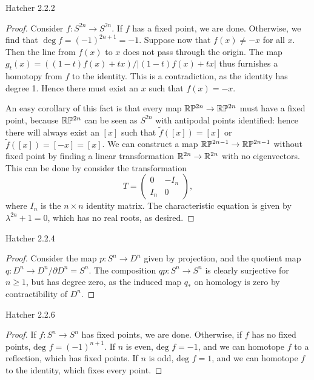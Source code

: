\documentclass{../../mathnotes}
\begin{document}
\begin{prop}
    Hatcher 2.2.2    
\end{prop}
\begin{proof}
    Consider $f:S^{2n}\to S^{2n}$. If $f$ has a fixed point, we are done. Otherwise, we find that $\deg f=(-1)^{2n+1}=-1$.
    Suppose now that $f(x)\neq -x$ for all $x$. Then the line from $f(x)$ to $x$ does not pass through the origin. The
    map $g_t(x)=\left( (1-t)f(x)+tx \right)/|(1-t)f(x)+tx|$ thus furnishes a homotopy from $f$ to the identity. This is
    a contradiction, as the identity has degree 1. Hence there must exist an $x$ such that $f(x)=-x$.

    An easy corollary of this fact is that every map $\mathbb{R}\mathbb{P}^{2n}\to\mathbb{R}\mathbb{P}^{2n}$ must have a fixed point, because
    $\mathbb{R}\mathbb{P}^{2n}$ can be seen as $S^{2n}$ with antipodal points identified: hence there will always exist an $[x]$
    such that $\tilde f([x])=[x]$ or $\tilde f([x])=[-x]=[x]$. We can construct a map $\mathbb{R}\mathbb{P}^{2n-1}\to\mathbb{R}\mathbb{P}^{2n-1}$
    without fixed point by finding a linear transformation $\mathbb{R}^{2n}\to\mathbb{R}^{2n}$ with no eigenvectors. This can
    be done by consider the transformation
    \begin{equation*}
        T=
        \begin{pmatrix}
            0 & -I_n\\
            I_n & 0
        \end{pmatrix},
    \end{equation*}
    where $I_n$ is the $n\times n$ identity matrix. The characteristic equation is given by $\lambda^{2n}+1=0$, which
    has no real roots, as desired.
\end{proof}

\begin{prop}
    Hatcher 2.2.4
\end{prop}
\begin{proof}
    Consider the map $p:S^n\to D^n$ given by projection, and the quotient map $q:D^n\to D^n/\partial D^n=S^n$. The composition
    $qp:S^n\to S^n$ is clearly surjective for $n\geq 1$, but has degree zero, as the induced map $q_*$ on homology is zero
    by contractibility of $D^n$.
\end{proof}

\begin{prop}
    Hatcher 2.2.6
\end{prop}
\begin{proof}
    If $f:S^n\to S^n$ has fixed points, we are done. Otherwise, if $f$ has no fixed points, $\text{deg }f=(-1)^{n+1}$.
    If $n$ is even, $\text{deg }f=-1$, and we can homotope $f$ to a reflection, which has fixed points. If $n$
    is odd, $\text{deg }f=1$, and we can homotope $f$ to the identity, which fixes every point.
\end{proof}
\end{document}
